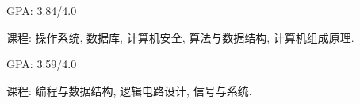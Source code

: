\newcommand{\TUBentry}{
    \TUB
    \poswithprd{Introduction to 3D Scanning and Printing at TUB Winter University}{Jan 2018-Feb 2018}
    \begin{itemize}
        \item 
        Learned the basic of 3D scanning \& printing. Learned Blender for 3D modeling.
    \end{itemize}
}



\UM
{}
\begin{miniItemize}
    \item GPA: 3.84/4.0
    \item 课程:
        操作系统,
        数据库,
        计算机安全,
        算法与数据结构,
        计算机组成原理.
\end{miniItemize}

\SJTU
{}
\begin{miniItemize}
    \item GPA: 3.59/4.0
    \item 课程:
        编程与数据结构,
        逻辑电路设计,
        信号与系统.
\end{miniItemize}

